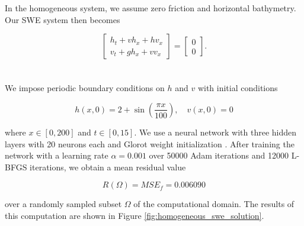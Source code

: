 In the homogeneous system, we assume zero friction and horizontal bathymetry. Our SWE system then becomes

$$
\renewcommand*{\arraystretch}{1.5}\begin{bmatrix}
    
    h_t + v h_x + h v_x \\
    v_t + g h_x + v v_x
\end{bmatrix} = \begin{bmatrix}
    0 \\
    0
\end{bmatrix}.
$$
\ \\\\
\noindent We impose periodic boundary conditions on $h$ and $v$ with initial conditions

$$
h(x, 0) = 2 + \sin{\left( \frac{\pi x}{100} \right)}, \quad v(x, 0) = 0
$$

\noindent where $x \in [0, 200]$ and $t \in [0, 15]$. We use a neural network with three hidden layers with 20 neurons 
each and Glorot weight initialization \cite{glorot2010understanding}. After training the network with a learning rate
$\alpha = 0.001$ over 50000 Adam iterations and 12000 L-BFGS iterations, we obtain a mean residual value

$$
R(\Omega) = MSE_f = 0.006090
$$

\noindent over a randomly sampled subset $\Omega$ of the computational domain. The results of this computation are shown 
in Figure \ref{fig:homogeneous_swe_solution}.

